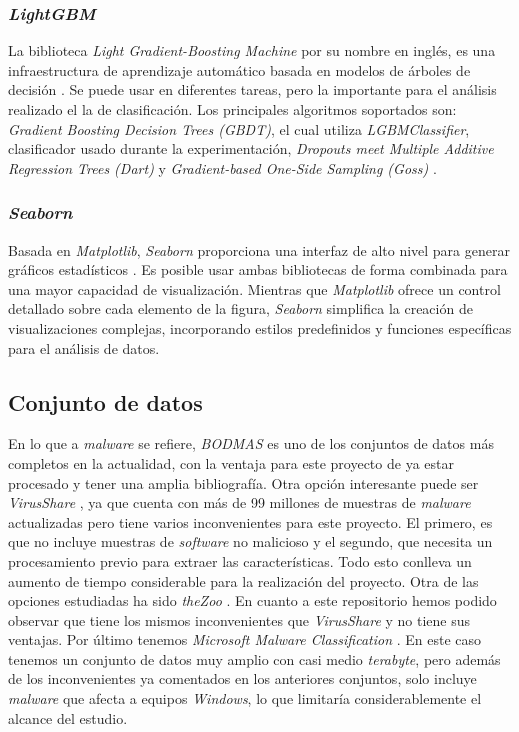 \subsubsection{\textit{LightGBM}}
\label{subsubsec:lightgbm}

La biblioteca \textit{Light Gradient-Boosting Machine} por su nombre en inglés, es una infraestructura de aprendizaje automático basada en modelos de árboles de decisión \cite{lgbm}. Se puede usar en diferentes tareas, pero la importante para el análisis realizado el la de clasificación. Los principales algoritmos soportados son: \textit{Gradient Boosting Decision Trees (GBDT)}, el cual utiliza \textit{LGBMClassifier}, clasificador usado durante la experimentación, \textit{Dropouts meet Multiple Additive Regression Trees (Dart)} y \textit{Gradient-based One-Side Sampling (Goss)} \cite{lgbm_alg}.

\subsubsection{\textit{Seaborn}}
\label{subsubsec:seaborn}

Basada en \textit{Matplotlib}, \textit{Seaborn} proporciona una interfaz de alto nivel para generar gráficos estadísticos \cite{seaborn}. Es posible usar ambas bibliotecas de forma combinada para una mayor capacidad de visualización. Mientras que \textit{Matplotlib} ofrece un control detallado sobre cada elemento de la figura, \textit{Seaborn} simplifica la creación de visualizaciones complejas, incorporando estilos predefinidos y funciones específicas para el análisis de datos.

\subsection{Conjunto de datos}
\label{subsec:select_dataset}

En lo que a \textit{malware} se refiere, \textit{BODMAS} \cite{bodmas} es uno de los conjuntos de datos más completos en la actualidad, con la ventaja para este proyecto de ya estar procesado y tener una amplia bibliografía. Otra opción interesante puede ser \textit{VirusShare} \cite{virusshare}, ya que cuenta con más de 99 millones de muestras de \textit{malware} actualizadas pero tiene varios inconvenientes para este proyecto. El primero, es que no incluye muestras de \textit{software} no malicioso y el segundo, que necesita un procesamiento previo para extraer las características. Todo esto conlleva un aumento de tiempo considerable para la realización del proyecto. Otra de las opciones estudiadas ha sido \textit{theZoo} \cite{thezoo}. En cuanto a este repositorio hemos podido observar que tiene los mismos inconvenientes que \textit{VirusShare} y no tiene sus ventajas. Por último tenemos \textit{Microsoft Malware Classification} \cite{malware-classification}. En este caso tenemos un conjunto de datos muy amplio con casi medio \textit{terabyte}, pero además de los inconvenientes ya comentados en los anteriores conjuntos, solo incluye \textit{malware} que afecta a equipos \textit{Windows}, lo que limitaría considerablemente el alcance del estudio.

